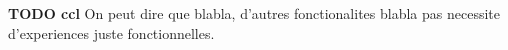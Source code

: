 {\color{red} \textbf{TODO ccl}}
On peut dire que blabla, d'autres fonctionalites blabla pas necessite d'experiences juste fonctionnelles.
